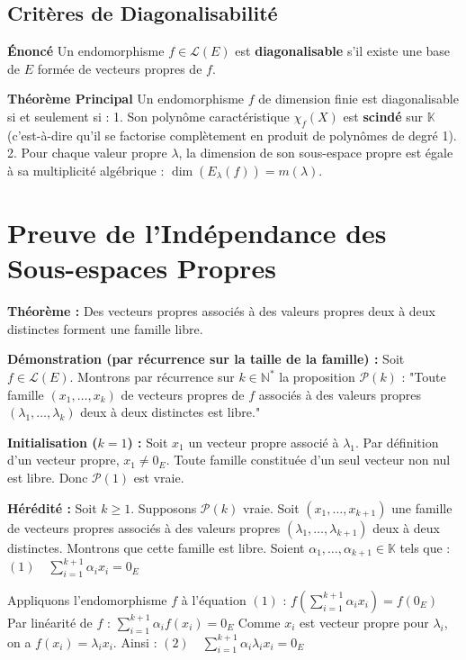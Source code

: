 \documentclass[11pt,a4paper]{article}
\begin{document}
\subsection{Critères de Diagonalisabilité}

\textbf{Énoncé}
Un endomorphisme $f \in \mathcal{L}(E)$ est \textbf{diagonalisable} s'il existe une base de $E$ formée de vecteurs propres de $f$.

\textbf{Théorème Principal}
Un endomorphisme $f$ de dimension finie est diagonalisable si et seulement si :
1. Son polynôme caractéristique $\chi_f(X)$ est \textbf{scindé} sur $\mathbb{K}$ (c'est-à-dire qu'il se factorise complètement en produit de polynômes de degré 1).
2. Pour chaque valeur propre $\lambda$, la dimension de son sous-espace propre est égale à sa multiplicité algébrique : $\dim(E_\lambda(f)) = m(\lambda)$.

\section{Preuve de l'Indépendance des Sous-espaces Propres}

\textbf{Théorème :} Des vecteurs propres associés à des valeurs propres deux à deux distinctes forment une famille libre.

\textbf{Démonstration (par récurrence sur la taille de la famille) :}
Soit $f \in \mathcal{L}(E)$.
Montrons par récurrence sur $k \in \mathbb{N}^*$ la proposition $\mathcal{P}(k)$ : "Toute famille $(x_1, \dots, x_k)$ de vecteurs propres de $f$ associés à des valeurs propres $(\lambda_1, \dots, \lambda_k)$ deux à deux distinctes est libre."

\textbf{Initialisation ($k=1$) :}
Soit $x_1$ un vecteur propre associé à $\lambda_1$. Par définition d'un vecteur propre, $x_1 \neq 0_E$.
Toute famille constituée d'un seul vecteur non nul est libre.
Donc $\mathcal{P}(1)$ est vraie.

\textbf{Hérédité :}
Soit $k \geq 1$. Supposons $\mathcal{P}(k)$ vraie.
Soit $(x_1, \dots, x_{k+1})$ une famille de vecteurs propres associés à des valeurs propres $(\lambda_1, \dots, \lambda_{k+1})$ deux à deux distinctes.
Montrons que cette famille est libre.
Soient $\alpha_1, \dots, \alpha_{k+1} \in \mathbb{K}$ tels que :
$(1) \quad \sum_{i=1}^{k+1} \alpha_i x_i = 0_E$

Appliquons l'endomorphisme $f$ à l'équation $(1)$ :
$f\left(\sum_{i=1}^{k+1} \alpha_i x_i\right) = f(0_E)$
Par linéarité de $f$ :
$\sum_{i=1}^{k+1} \alpha_i f(x_i) = 0_E$
Comme $x_i$ est vecteur propre pour $\lambda_i$, on a $f(x_i) = \lambda_i x_i$. Ainsi :
$(2) \quad \sum_{i=1}^{k+1} \alpha_i \lambda_i x_i = 0_E$
\end{document}
